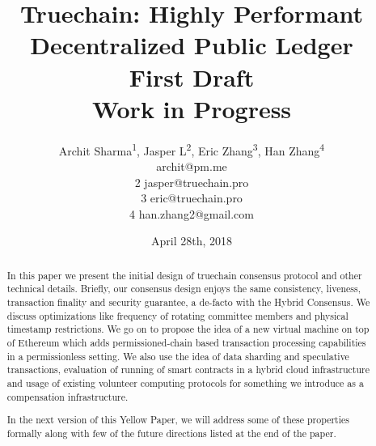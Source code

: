 \documentclass[9pt,oneside]{amsart}
\title{%
  \bf Truechain: Highly Performant Decentralized Public Ledger \\
  \small First Draft \\
  \small Work in Progress}
\date{April 28th, 2018}
\author{%
 Archit Sharma\textsuperscript{1}, Jasper L\textsuperscript{2}, Eric Zhang\textsuperscript{3}, Han Zhang\textsuperscript{4}\\[1ex]
 \newline
 1 archit@pm.me\\
 2 jasper@truechain.pro\\
 3 eric@truechain.pro\\
 4 han.zhang2@gmail.com\\
 }
\begin{document}


\pagecolor{yellowpapercolor}

\begin{abstract}
In this paper we present the initial design of truechain consensus protocol and other technical details.
Briefly, our consensus design enjoys the same consistency, liveness, transaction finality and security guarantee, a
de-facto with the Hybrid Consensus. We discuss optimizations like frequency of rotating committee members and physical
timestamp restrictions. We go on to propose the idea of a new virtual machine on top of Ethereum which adds
permissioned-chain based transaction processing capabilities in a permissionless setting. We also use the idea of
data sharding and speculative transactions, evaluation of running of smart contracts in a hybrid cloud infrastructure and
usage of existing volunteer computing protocols for something we introduce as a compensation infrastructure.

In the next version of this Yellow Paper, we will address some of these properties formally along with few of the future
directions listed at the end of the paper.
\end{abstract}

\maketitle
\end{document}
